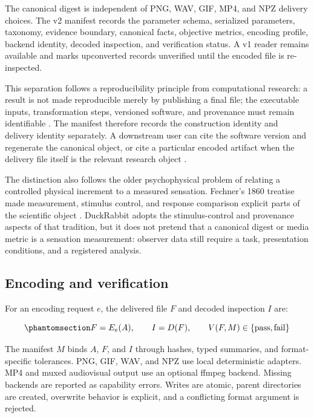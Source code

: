 \documentclass[
  english,
]{article}
\begin{document}
The canonical digest is independent of PNG, WAV, GIF, MP4, and NPZ
delivery choices. The v2 manifest records the parameter schema,
serialized parameters, taxonomy, evidence boundary, canonical facts,
objective metrics, encoding profile, backend identity, decoded
inspection, and verification status. A v1 reader remains available and
marks upconverted records unverified until the encoded file is
re-inspected.

This separation follows a reproducibility principle from computational
research: a result is not made reproducible merely by publishing a final
file; the executable inputs, transformation steps, versioned software,
and provenance must remain identifiable
\citep{sandve2013simple, wilson2014bestpractices}. The manifest
therefore records the construction identity and delivery identity
separately. A downstream user can cite the software version and
regenerate the canonical object, or cite a particular encoded artifact
when the delivery file itself is the relevant research object
\citep{smith2016software}.

The distinction also follows the older psychophysical problem of
relating a controlled physical increment to a measured sensation.
Fechner's 1860 treatise made measurement, stimulus control, and response
comparison explicit parts of the scientific object
\citep{fechner1860psychophysics}. DuckRabbit adopts the stimulus-control
and provenance aspects of that tradition, but it does not pretend that a
canonical digest or media metric is a sensation measurement: observer
data still require a task, presentation conditions, and a registered
analysis.

\subsection{Encoding and verification}\label{encoding-and-verification}

For an encoding request \(e\), the delivered file \(F\) and decoded
inspection \(I\) are:

\begin{equation}\protect\phantomsection\label{eq:encoding_verification}{
F = E_e(A), \qquad I = D(F), \qquad V(F,M) \in \{\mathrm{pass},\mathrm{fail}\}
}\end{equation}

The manifest \(M\) binds \(A\), \(F\), and \(I\) through hashes, typed
summaries, and format-specific tolerances. PNG, GIF, WAV, and NPZ use
local deterministic adapters. MP4 and muxed audiovisual output use an
optional ffmpeg backend. Missing backends are reported as capability
errors. Writes are atomic, parent directories are created, overwrite
behavior is explicit, and a conflicting format argument is rejected.
\end{document}
